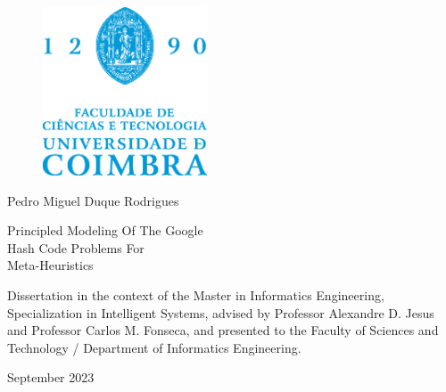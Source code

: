 \begin{cover}
  \vspace*{\fill}

  \begin{figure}[h!]
    \centering
    \includegraphics[height=5cm, keepaspectratio]{../assets/cover/fctuc-logo.eps}
  \end{figure}

  \vspace{\fill}

  \large{Pedro Miguel Duque Rodrigues}

  \vspace*{\fill}

  \LARGE{\sffamily Principled Modeling Of The Google \\ Hash Code Problems For \\ Meta-Heuristics}

  \vspace*{\fill}

  \normalsize{
    Dissertation in the context of the Master in Informatics Engineering,
    Specialization in Intelligent Systems, advised by Professor Alexandre D. Jesus
    and Professor Carlos M. Fonseca, and presented to the Faculty of
    Sciences and Technology / Department of Informatics Engineering.
  }

  \vspace{\fill}

  \normalsize{\centering September 2023}

  \vspace*{\fill}
\end{cover}